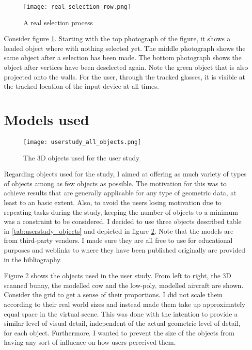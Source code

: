 \begin{figure}[htb]
  \centering
  \texttt{[image: real\_selection\_row.png]}\\ %
  \caption{A real selection process}\label{fig:real_selection}
\end{figure}

Consider figure \ref{fig:real_selection}. Starting with the top photograph of the figure, it shows a loaded object where with nothing selected yet. The middle photograph shows the same object after a selection has been made. The bottom photograph shows the object after vertices have been deselected again. Note the green object that is also projected onto the walls. For the user, through the tracked glasses, it is visible at the tracked location of the input device at all times.

	\section{Models used}
	\label{sec:models_used}
%
%

\begin{figure}[htb]
  \centering
  \texttt{[image: userstudy\_all\_objects.png]}\\ %
  \caption{The 3D objects used for the user study}\label{fig:all_objects}
\end{figure}

Regarding objects used for the study, I aimed at offering as much variety of types of objects among as few objects as possible. The motivation for this was to achieve results that are generally applicable for any type of geometric data, at least to an basic extent. Also, to avoid the users losing motivation due to repeating tasks during the study, keeping the number of objects to a minimum was a constraint to be considered. I decided to use three objects described table in \ref{tab:userstudy_objects} and depicted in figure \ref{fig:all_objects}. Note that the models are from third-party vendors. I made sure they are all free to use for educational purposes and weblinks to where they have been published originally are provided in the bibliography.

Figure \ref{fig:all_objects} shows the objects used in the user study. From left to right, the 3D scanned bunny, the modelled cow and the low-poly, modelled aircraft are shown. Consider the grid to get a sense of their proportions. I did not scale them according to their real world sizes and instead made them take up approximately equal space in the virtual scene. This was done with the intention to provide a similar level of visual detail, independent of the actual geometric level of detail, for each object. Furthermore, I wanted to prevent the size of the objects from having any sort of influence on how users perceived them.

